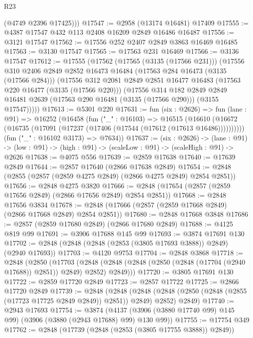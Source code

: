 \begin{lexlean}{R23}
\begin{coremodule}
        (@4749 @2396 @17425)))
@17547 := @2958 (@13174 @16481) @17409
@17555 := @4387 @17547 @432 @113 @2408 @16209 @2849 @16486 @16487
@17556 := @3121 @17547
@17562 := @17556 @252 @2407 @2849 @3863 @16469 @16485
@17563 := @3130 @17547
@17565 := @17563 @231 @16469
@17566 := @3136 @17547
@17612 := @17555
    (@17562
      (@17565 (@3135 (@17566 @231)))
      (@17556
        @310
        @2406
        @2849
        @2852
        @16473
        @16484
        (@17563 @284 @16473 (@3135 (@17566 @284)))
        (@17556
          @312
          @2081
          @2849
          @2851
          @16477
          @16483
          (@17563 @220 @16477 (@3135 (@17566 @220)))
          (@17556
            @314
            @182
            @2849
            @2849
            @16481
            @2639
            (@17563 @290 @16481 (@3135 (@17566 @290)))
            (@3155 @17547)))))
@17613 := @5301 @220
@17631 := fun (six : @2626) =>
  fun (lane : @91) =>
  @16252
    (@16458
      (fun ("_" : @16103) =>
      @16515
        (@16610 (@16672 (@16735 (@17091 (@17237 (@17406 (@17544 (@17612 (@17613 @16486))))))))))
      (fun ("_" : @16102 @3173) => @7634))
@17637 := (six : @2626) ->
  (lane : @91) -> (low : @91) -> (high : @91) -> (scaleLow : @91) -> (scaleHigh : @91) -> @2626
@17638 := @4075 @556
@17639 := @2859 @17638
@17640 := @17639 @2849
@17644 := @2857 @17640 (@2866 @17638 @2849)
@17654 := @2848 (@2855 (@2857 (@2859 @4275 @2849) (@2866 @4275 @2849) @2854 @2851))
@17656 := @2848 @4275 @3820
@17666 := @2848 (@17654 (@2857 (@2859 @17656 @2849) (@2866 @17656 @2849) @2854 @2851))
@17668 := @2848 @17656 @3834
@17678 := @2848 (@17666 (@2857 (@2859 @17668 @2849) (@2866 @17668 @2849) @2854 @2851))
@17680 := @2848 @17668 @3848
@17686 := @2857 (@2859 @17680 @2849) (@2866 @17680 @2849)
@17688 := @4125 @819 @99
@17691 := @3906 @17688 @145 @99
@17693 := @3874 @17691 @130
@17702 := @2848 (@2848 (@2848 (@2853 (@3805 @17693 @3888)) @2849) (@2940 @17693))
@17703 := @4120 @9753
@17704 := @2848 @3868
@17718 := @2848
    (@2850
      (@17703
        (@2848 (@2848 (@2848 (@2850 (@2848 (@17704 (@2940 @17688)) @2851)) @2849) @2852) @2849)))
@17720 := @3805 @17691 @130
@17722 := @2859 @17720 @2849
@17723 := @2857 @17722
@17725 := @2866 @17720 @2849
@17739 := @2848
    (@2848
      (@2848 (@2848 (@2850 (@2848 (@2855 (@17723 @17725 @2849 @2849)) @2851)) @2849) @2852)
      @2849)
@17740 := @2943 @17693
@17754 := @3874
    (@4137 (@3906 (@3880 @17740 @99) @145 @99) (@3906 (@3880 (@2943 @17688) @99) @130 @99))
@17755 := @17754 @349
@17762 := @2848 (@17739 (@2848 (@2853 (@3805 @17755 @3888)) @2849))

\end{coremodule}
\end{lexlean}
